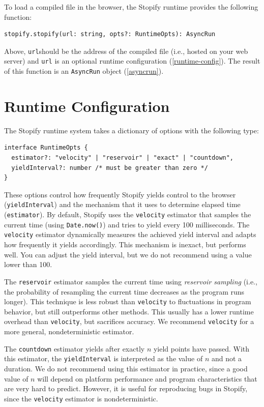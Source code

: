 \documentclass[10pt]{book}
\begin{document}
\lstset{language=js}
To load a compiled file in the browser, the Stopify runtime provides
the following function:
\begin{lstlisting}
stopify.stopify(url: string, opts?: RuntimeOpts): AsyncRun
\end{lstlisting}

Above, \lstinline|url|should be the address of the compiled file (i.e., hosted on
your web server) and \lstinline|url| is an optional runtime configuration
(\cref{runtime-config}). The result of this function is an \lstinline|AsyncRun|
object (\cref{asyncrun}).

\section{Runtime Configuration\label{runtime-config}}

The Stopify runtime system takes a dictionary of options with the
following type:

\lstset{language=js}
\begin{lstlisting}
interface RuntimeOpts {
  estimator?: "velocity" | "reservoir" | "exact" | "countdown",
  yieldInterval?: number /* must be greater than zero */
}
\end{lstlisting}

These options control how frequently Stopify yields control to the browser
(\lstinline|yieldInterval|) and the mechanism that it uses to determine
elapsed time (\lstinline|estimator|).
By default, Stopify uses the \texttt{velocity} estimator that samples the current
time (using \lstinline|Date.now()|) and tries to yield every 100 milliseconds.
The \texttt{velocity} estimator dynamically measures the achieved yield interval
and adapts how frequently it yields accordingly. This mechanism is inexact, but
performs well. You can adjust the yield interval, but we do not recommend using
a value lower than 100.

The \texttt{reservoir} estimator samples the current time using
\emph{reservoir sampling} (i.e., the probability of resampling the current time
decreases as the program runs longer). This technique
is less robust than \texttt{velocity} to fluctuations in program behavior, but
still outperforms other methods. This usually has a lower runtime overhead than
\texttt{velocity}, but sacrifices accuracy. We recommend \texttt{velocity} for a
more general, nondeterministic estimator.

The \texttt{countdown} estimator yields after exactly $n$
yield points have passed. With this estimator, the \texttt{yieldInterval}
is interpreted as the value of $n$ and not a duration. We do not recommend
using this estimator in practice, since a good value of $n$ will depend on
platform performance and program characteristics that are very hard to
predict. However, it is useful for reproducing bugs in Stopify, since
the \texttt{velocity} estimator is nondeterministic.
\end{document}
